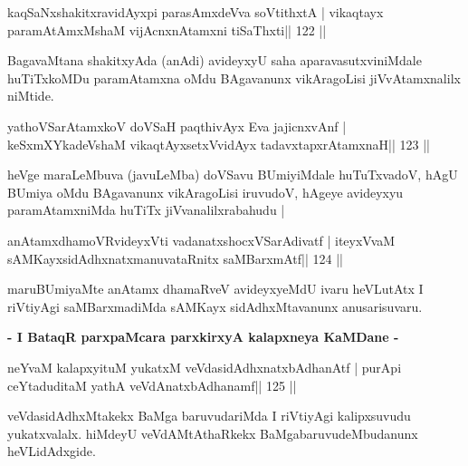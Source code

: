 
\begin{shl}
kaqSaNxshakitxravidAyx\s pi parasAmxdeVva soVtithxtA |
vikaqtayx paramAtAmxMshaM vijAcnxnAtamxni tiSaThxti\hfill || 122 ||
\end{shl}

\begin{artha}
BagavaMtana shakitxyAda (anAdi) avideyxyU saha aparavasutxviniMdale huTiTxkoMDu paramAtamxna oMdu BAgavanunx vikAragoLisi jiVvAtamxnalilx niMtide.
\end{artha}


\begin{shl}
yathoVSarAtamxkoV doVSaH paqthivAyx Eva jajicnxvAnf |
keSxmXYkadeVshaM vikaqtAyx\s\s setxV\s vidAyx tadavxtapxrAtamxnaH\hfill || 123 ||
\end{shl}

\begin{artha}
heVge maraLeMbuva (javuLeMba) doVSavu BUmiyiMdale huTuTxvadoV, hAgU BUmiya oMdu
BAgavanunx vikAragoLisi iruvudoV, hAgeye avideyxyu paramAtamxniMda
huTiTx jiVvanalilxrabahudu |
\end{artha}


\begin{shl}
anAtamxdhamoVR\s videyxVti vadanatxshocxVSarAdivatf |
iteyxVvaM sAMKayxsidAdhxnatxmanuvataRnitx saMBarxmAtf\hfill || 124 ||
\end{shl}

\begin{artha}
maruBUmiyaMte anAtamx dhamaRveV avideyxyeMdU ivaru heVLutAtx I riVtiyAgi saMBarxmadiMda sAMKayx sidAdhxMtavanunx anusarisuvaru.
\end{artha}

\begin{center}
\textbf{- I BataqR parxpaMcara parxkirxyA kalapxneya KaMDane -}
\end{center}

\begin{shl}
neYvaM kalapxyituM yukatxM veVdasidAdhxnatxbAdhanAtf |
purA\s pi ceYtaduditaM yathA veVdAnatxbAdhanamf\hfill || 125 ||
\end{shl}

\begin{artha}
veVdasidAdhxMtakekx BaMga baruvudariMda I riVtiyAgi kalipxsuvudu yukatxvalalx. hiMdeyU veVdAMtAthaRkekx BaMgabaruvudeMbudanunx heVLidAdxgide.
\end{artha}

